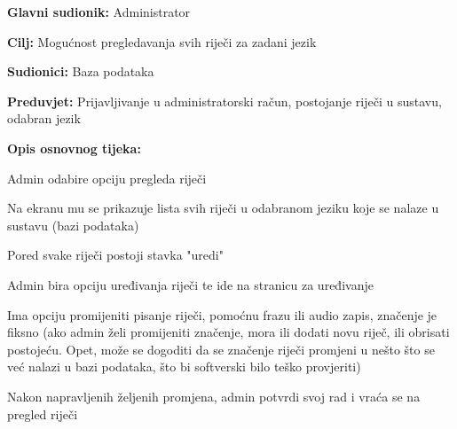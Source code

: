 \noindent {}
\begin{packed_item}

	\item \textbf{Glavni sudionik: } Administrator
	\item \textbf{Cilj: } Mogućnost pregledavanja svih riječi za zadani jezik
	\item \textbf{Sudionici: } Baza podataka
	\item \textbf{Preduvjet: } Prijavljivanje u administratorski račun, postojanje riječi u sustavu, odabran jezik
	\item  \textbf{Opis osnovnog tijeka:}
	
	\item[] \begin{packed_enum}
		
		\item Admin odabire opciju pregleda riječi
		\item Na ekranu mu se prikazuje lista svih riječi u odabranom jeziku koje se nalaze u sustavu (bazi podataka)
		\item Pored svake riječi postoji stavka "uredi"
		\item Admin bira opciju uređivanja riječi te ide na stranicu za uređivanje
		\item Ima opciju promijeniti pisanje riječi, pomoćnu frazu ili audio zapis, značenje je fiksno (ako admin želi promijeniti značenje, mora ili dodati novu riječ, ili obrisati postojeću. Opet, može se dogoditi da se značenje riječi promjeni u nešto što se već nalazi u bazi podataka, što bi softverski bilo teško provjeriti)
		\item Nakon napravljenih željenih promjena, admin potvrdi svoj rad i vraća se na pregled riječi

	\end{packed_enum}
	
\end{packed_item}

